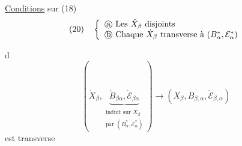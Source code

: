 \uline{Conditions} sur (18)
\[
(20)\quad\left\{
\begin{array}{l}
\text{\textcircled{a} Les }\dot X_\beta\text{ disjoints}\\
\text{\textcircled{b} Chaque }\dot X_\beta\text{ transverse à }(B_\alpha^*,\mathcal E_\alpha^*)
\end{array}\right.
\]

\textcircled{d}
\[
(\dot X_\beta,
\underbrace{\dot B_{\beta\alpha},\dot{\mathcal E}_{\beta\alpha}}
_{\substack{\text{induit sur }\dot X_\beta\\
\text{par }(B_\alpha^*,\mathcal E_\alpha^*)}})
\longrightarrow
(X_\beta,B_{\beta,\alpha},\dot{\mathcal E}_{\beta,\alpha})
\]
est transverse

